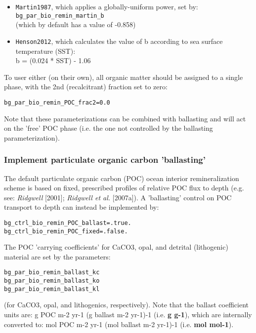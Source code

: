 \documentclass[11pt,fleqn]{book} %
\begin{document}
\begin{itemize}[noitemsep]

\vspace{1mm}
\item \texttt{Martin1987}, which applies a globally-uniform power, set by:
  \\ \texttt{bg\_par\_bio\_remin\_martin\_b}
  \\(which by default has a value of -0.858)
  
\vspace{1mm}
\item \texttt{Henson2012}, which calculates the value of b according to sea surface temperature (SST):
  \\b = (0.024 * SST) - 1.06
  
\end{itemize}

To user either (on their own), all organic matter should be assigned to a single phase, with the 2nd (recalcitrant) fraction set to zero:
\vspace{-2pt}\begin{verbatim}
bg_par_bio_remin_POC_frac2=0.0
\end{verbatim}\vspace{-2pt}

Note that these parameterizations can be combined with ballasting and will act on the 'free' POC phase (i.e. the one not controlled by the ballasting parameterization).

%
\subsubsection{Implement particulate organic carbon 'ballasting'}
\vspace{1mm}

The default particulate organic carbon (POC) ocean interior remineralization scheme is based on fixed, prescribed profiles of relative POC flux to depth (e.g. see: \textit{Ridgwell} [2001]; \textit{Ridgwell et al.} [2007a]). A 'ballasting' control on POC transport to depth can instead be implemented by:
\vspace{-2pt}\begin{verbatim}
bg_ctrl_bio_remin_POC_ballast=.true.
bg_ctrl_bio_remin_POC_fixed=.false.
\end{verbatim}\vspace{-2pt}

The POC 'carrying coefficients' for CaCO3, opal, and detrital (lithogenic) material are set by the parameters:
\vspace{-2pt}\begin{verbatim}
bg_par_bio_remin_ballast_kc
bg_par_bio_remin_ballast_ko
bg_par_bio_remin_ballast_kl
\end{verbatim}\vspace{-2pt}
(for CaCO3, opal, and lithogenics, respectively). Note that the ballast coefficient units are: g POC m-2 yr-1 (g ballast m-2 yr-1)-1 (i.e. \textbf{g g-1}), which are internally converted to: mol POC m-2 yr-1 (mol ballast m-2 yr-1)-1 (i.e. \textbf{mol mol-1}).
\end{document}

